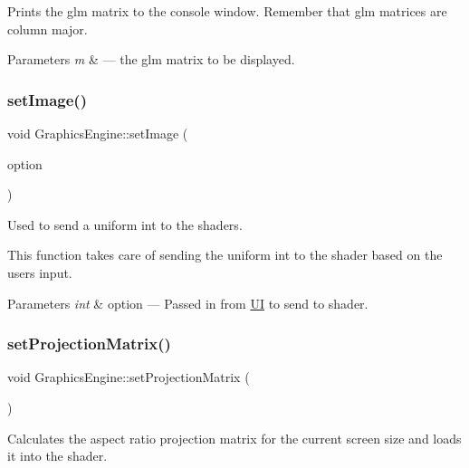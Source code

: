 Prints the glm matrix to the console window. Remember that glm matrices are column major. 


\begin{DoxyParams}{Parameters}
{\em m} & --- the glm matrix to be displayed. \\
\hline
\end{DoxyParams}
\mbox{\label{class_graphics_engine_a865593938e62d6de6a229be7fc4a971a}} 
\subsubsection{\texorpdfstring{set\+Image()}{setImage()}}
{\footnotesize\ttfamily void Graphics\+Engine\+::set\+Image (\begin{DoxyParamCaption}\item[{int}]{option }\end{DoxyParamCaption})}



Used to send a uniform int to the shaders. 

This function takes care of sending the uniform int to the shader based on the user\textquotesingle{}s input.


\begin{DoxyParams}{Parameters}
{\em int} & option --- Passed in from \hyperlink{class_u_i}{UI} to send to shader. \\
\hline
\end{DoxyParams}
\mbox{\label{class_graphics_engine_ad08e9c3cefa14b160d478520b3f9b376}} 
\subsubsection{\texorpdfstring{set\+Projection\+Matrix()}{setProjectionMatrix()}}
{\footnotesize\ttfamily void Graphics\+Engine\+::set\+Projection\+Matrix (\begin{DoxyParamCaption}{ }\end{DoxyParamCaption})}



Calculates the aspect ratio projection matrix for the current screen size and loads it into the shader. 


